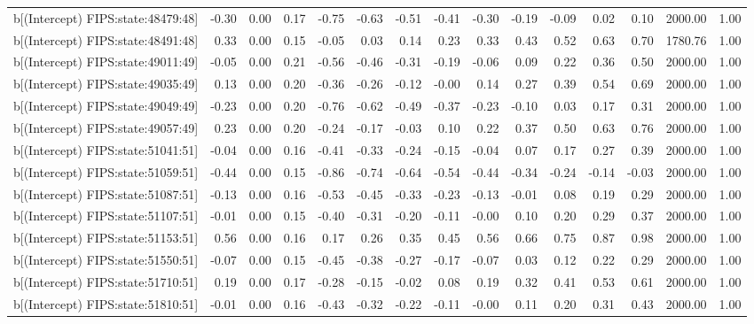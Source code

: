 \begin{table}[ht]
\begin{tabular}{rrrrrrrrrrrrrrr}
  b[(Intercept) FIPS:state:48479:48] & -0.30 & 0.00 & 0.17 & -0.75 & -0.63 & -0.51 & -0.41 & -0.30 & -0.19 & -0.09 & 0.02 & 0.10 & 2000.00 & 1.00 \\ 
  b[(Intercept) FIPS:state:48491:48] & 0.33 & 0.00 & 0.15 & -0.05 & 0.03 & 0.14 & 0.23 & 0.33 & 0.43 & 0.52 & 0.63 & 0.70 & 1780.76 & 1.00 \\ 
  b[(Intercept) FIPS:state:49011:49] & -0.05 & 0.00 & 0.21 & -0.56 & -0.46 & -0.31 & -0.19 & -0.06 & 0.09 & 0.22 & 0.36 & 0.50 & 2000.00 & 1.00 \\ 
  b[(Intercept) FIPS:state:49035:49] & 0.13 & 0.00 & 0.20 & -0.36 & -0.26 & -0.12 & -0.00 & 0.14 & 0.27 & 0.39 & 0.54 & 0.69 & 2000.00 & 1.00 \\ 
  b[(Intercept) FIPS:state:49049:49] & -0.23 & 0.00 & 0.20 & -0.76 & -0.62 & -0.49 & -0.37 & -0.23 & -0.10 & 0.03 & 0.17 & 0.31 & 2000.00 & 1.00 \\ 
  b[(Intercept) FIPS:state:49057:49] & 0.23 & 0.00 & 0.20 & -0.24 & -0.17 & -0.03 & 0.10 & 0.22 & 0.37 & 0.50 & 0.63 & 0.76 & 2000.00 & 1.00 \\ 
  b[(Intercept) FIPS:state:51041:51] & -0.04 & 0.00 & 0.16 & -0.41 & -0.33 & -0.24 & -0.15 & -0.04 & 0.07 & 0.17 & 0.27 & 0.39 & 2000.00 & 1.00 \\ 
  b[(Intercept) FIPS:state:51059:51] & -0.44 & 0.00 & 0.15 & -0.86 & -0.74 & -0.64 & -0.54 & -0.44 & -0.34 & -0.24 & -0.14 & -0.03 & 2000.00 & 1.00 \\ 
  b[(Intercept) FIPS:state:51087:51] & -0.13 & 0.00 & 0.16 & -0.53 & -0.45 & -0.33 & -0.23 & -0.13 & -0.01 & 0.08 & 0.19 & 0.29 & 2000.00 & 1.00 \\ 
  b[(Intercept) FIPS:state:51107:51] & -0.01 & 0.00 & 0.15 & -0.40 & -0.31 & -0.20 & -0.11 & -0.00 & 0.10 & 0.20 & 0.29 & 0.37 & 2000.00 & 1.00 \\ 
  b[(Intercept) FIPS:state:51153:51] & 0.56 & 0.00 & 0.16 & 0.17 & 0.26 & 0.35 & 0.45 & 0.56 & 0.66 & 0.75 & 0.87 & 0.98 & 2000.00 & 1.00 \\ 
  b[(Intercept) FIPS:state:51550:51] & -0.07 & 0.00 & 0.15 & -0.45 & -0.38 & -0.27 & -0.17 & -0.07 & 0.03 & 0.12 & 0.22 & 0.29 & 2000.00 & 1.00 \\ 
  b[(Intercept) FIPS:state:51710:51] & 0.19 & 0.00 & 0.17 & -0.28 & -0.15 & -0.02 & 0.08 & 0.19 & 0.32 & 0.41 & 0.53 & 0.61 & 2000.00 & 1.00 \\ 
  b[(Intercept) FIPS:state:51810:51] & -0.01 & 0.00 & 0.16 & -0.43 & -0.32 & -0.22 & -0.11 & -0.00 & 0.11 & 0.20 & 0.31 & 0.43 & 2000.00 & 1.00 \\ 

\end{tabular}
\end{table}

